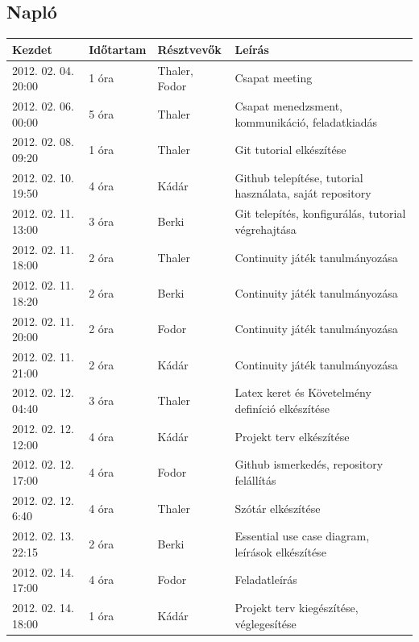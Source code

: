 \subsection{Napló}
    \begin{center} 
        \begin{tabular}{| l | p{1.9cm} | p{2.6cm} | p{6.1cm} |}
            \hline
                Kezdet & Időtartam & Résztvevők & Leírás \\
            \hline \hline 
2012. 02. 04. 20:00 & 1 óra & Thaler, Fodor & Csapat meeting\\ \hline
2012. 02. 06. 00:00 & 5 óra & Thaler & Csapat menedzsment, kommunikáció, feladatkiadás\\ \hline
2012. 02. 08.  09:20 & 1 óra & Thaler & Git tutorial elkészítése\\ \hline
2012. 02. 10. 19:50 & 4 óra & Kádár & Github telepítése, tutorial használata, saját repository\\ \hline
2012. 02. 11. 13:00 & 3 óra & Berki & Git telepítés, konfigurálás, tutorial végrehajtása\\ \hline
2012. 02. 11. 18:00 & 2 óra & Thaler & Continuity játék tanulmányozása\\ \hline
2012. 02. 11. 18:20 & 2 óra & Berki & Continuity játék tanulmányozása\\ \hline
2012. 02. 11. 20:00 & 2 óra & Fodor & Continuity játék tanulmányozása\\ \hline
2012. 02. 11. 21:00 & 2 óra & Kádár & Continuity játék tanulmányozása\\ \hline
2012. 02. 12. 04:40 & 3 óra & Thaler & Latex keret és Követelmény definíció elkészítése\\ \hline
2012. 02. 12. 12:00 & 4 óra & Kádár & Projekt terv elkészítése\\ \hline
2012. 02. 12. 17:00 & 4 óra & Fodor & Github ismerkedés, repository felállítás\\ \hline
2012. 02. 12. 6:40 & 4 óra & Thaler & Szótár elkészítése\\ \hline
2012. 02. 13. 22:15 & 2 óra & Berki & Essential use case diagram, leírások elkészítése\\ \hline
2012. 02. 14. 17:00 & 4 óra & Fodor & Feladatleírás\\ \hline
2012. 02. 14. 18:00 & 1 óra & Kádár & Projekt terv kiegészítése, véglegesítése\\ \hline

\end{tabular}
\end{center}
